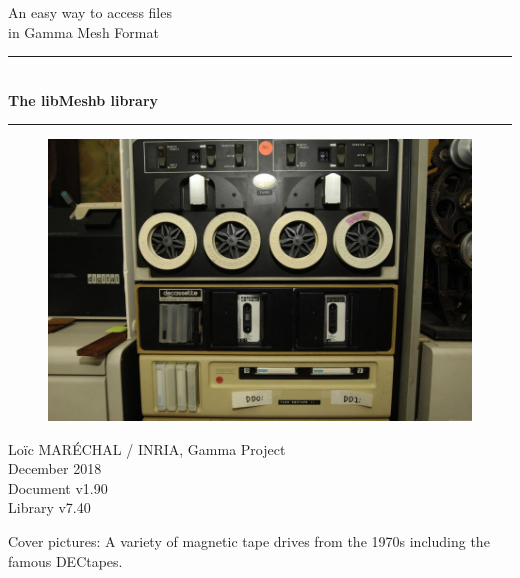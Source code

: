 \documentclass[a4paper,12pt]{article}
\newcommand{\HRule}{\rule{\linewidth}{1mm}}
\begin{document}
%
%

\begin{titlepage}

\begin{center}
\huge An easy way to access files\\ in Gamma Mesh Format
\HRule \\
\medskip
{\Huge \bfseries The libMeshb library} \\
\HRule
\end{center}

\vfill

\begin{figure}[htbp]
\begin{center}
\includegraphics[width=14cm]{tape.jpeg}
\end{center}
\end{figure}

\vfill

\begin{flushright}
\Large Lo\"ic MAR\'ECHAL / INRIA, Gamma Project\\
\Large December 2018 \\
\normalsize Document v1.90 \\
\normalsize Library v7.40
\end{flushright}

\end{titlepage}

\clearpage

\setcounter{tocdepth}{2}
\tableofcontents
\vfill

\footnotesize{Cover pictures: A variety of magnetic tape drives from the 1970s including the famous DECtapes.}
\normalsize

\clearpage
\end{document}
